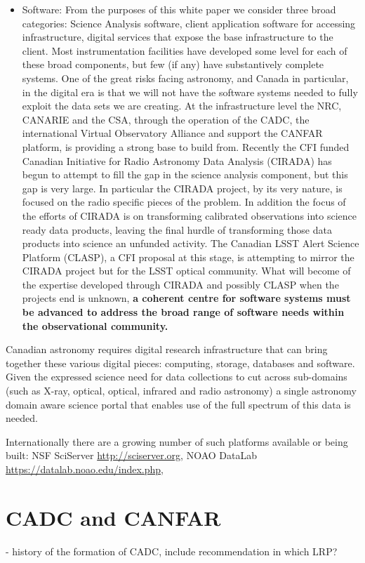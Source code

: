 \documentclass[11pt]{article}
\begin{document}
\begin{itemize}
    \item Software: From the purposes of this white paper we consider three broad categories: Science Analysis software, client application software for accessing infrastructure, digital services that expose the base infrastructure to the client.  Most instrumentation facilities have developed some level for each of these broad components, but few (if any) have substantively complete systems.  One of the great risks facing astronomy, and Canada in particular, in the digital era is that we  will not have the software systems needed to fully exploit the data sets we are creating.  At the infrastructure level the NRC, CANARIE and the CSA, through the operation of the CADC, the international Virtual Observatory Alliance and support the CANFAR platform, is providing a strong base to build from.  Recently the CFI funded Canadian Initiative for Radio Astronomy Data Analysis (CIRADA) has begun to attempt to fill the gap in the science analysis component, but this gap is very large.  In particular the CIRADA project, by its very nature, is focused on the radio specific pieces of the problem.  In addition the focus of the efforts of CIRADA is on transforming calibrated observations into science ready data products, leaving the final hurdle of transforming those data products into science an unfunded activity.  The Canadian LSST Alert Science Platform (CLASP), a CFI proposal at this stage, is attempting to mirror the CIRADA project but for the LSST optical community.  What will become of the expertise developed through CIRADA and possibly CLASP when the projects end is unknown, {\bf a coherent centre for software systems must be advanced to address the broad range of software needs within the observational community.}
\end{itemize}

Canadian astronomy requires digital research infrastructure that can bring together these various digital pieces:  computing, storage, databases and software.  Given the expressed science need for data collections to cut across sub-domains (such as X-ray, optical, optical, infrared and radio astronomy) a single astronomy domain aware science portal that enables use of the full spectrum of this data is needed.

Internationally there are a growing number of such platforms available or being built:  NSF SciServer \url{http://sciserver.org}, NOAO DataLab \url{https://datalab.noao.edu/index.php}, 

\section{CADC and CANFAR}
 - history of the formation of CADC, include recommendation in which LRP?
\end{document}
